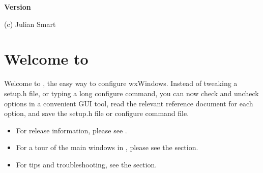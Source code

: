 %
\twocolwidtha{4cm}%
%
%
%
%
%
%
%
%
%
\newcommand{\commandref}[2]{\helpref{{\tt $\backslash$#1}}{#2}}%
\newcommand{\commandrefn}[2]{\helprefn{{\tt $\backslash$#1}}{#2}\index{#1}}%
\newcommand{\commandpageref}[2]{\latexignore{\helprefn{{\tt $\backslash$#1}}{#2}}\latexonly{{\tt $\backslash$#1} {\it page \pageref{#2}}}\index{#1}}%
\newcommand{\indexit}[1]{#1\index{#1}}%
\newcommand{\inioption}[1]{{\tt #1}\index{#1}}%
\parskip=10pt%
\parindent=0pt%
\title{\cttitle}%
\author{(c) Julian Smart, 2003}%
\makeindex%
%
\begin{center}

{\large {\bf Version \ctversion}}

(c) Julian Smart
\end{center}

\pagestyle{fancyplain}%
%
%
%
\setfooter{\thepage}{}{}{}{}{\thepage}%
\tableofcontents%


\chapter{Welcome to \ctshortname}%
%
\setfooter{\thepage}{}{}{}{}{\thepage}%

Welcome to \ctname, the easy way to configure wxWindows.
Instead of tweaking a setup.h file, or typing a long configure
command, you can now check and uncheck options in a convenient
GUI tool, read the relevant reference document for each
option, and save the setup.h file or configure command file.

\begin{itemize}\itemsep=0pt
\item For release information, please see .
\item For a tour of the main windows in \ctshortname, please see the  section.
\item For tips and troubleshooting, see the  section.
\end{itemize}

